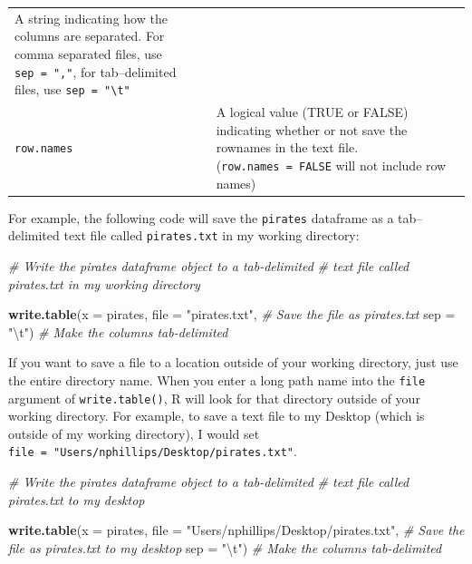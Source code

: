 \documentclass[]{book}
\newenvironment{Shaded}{\begin{snugshade}}{\end{snugshade}}
\newcommand{\KeywordTok}[1]{\textcolor[rgb]{0.13,0.29,0.53}{\textbf{{#1}}}}
\newcommand{\DataTypeTok}[1]{\textcolor[rgb]{0.13,0.29,0.53}{{#1}}}
\newcommand{\CharTok}[1]{\textcolor[rgb]{0.31,0.60,0.02}{{#1}}}
\newcommand{\StringTok}[1]{\textcolor[rgb]{0.31,0.60,0.02}{{#1}}}
\newcommand{\CommentTok}[1]{\textcolor[rgb]{0.56,0.35,0.01}{\textit{{#1}}}}
\newcommand{\NormalTok}[1]{{#1}}
\theoremstyle{definition}
\theoremstyle{definition}
\theoremstyle{remark}
\begin{document}
\begin{longtable}[]{@{}ll@{}}
\begin{minipage}[t]{0.67\columnwidth}
A string indicating how the columns are separated. For comma separated
files, use \texttt{sep\ =\ ","}, for tab--delimited files, use
\texttt{sep\ =\ "\textbackslash{}t"}\strut
\end{minipage}\tabularnewline
\begin{minipage}[t]{0.18\columnwidth}\raggedright\strut
\texttt{row.names}\strut
\end{minipage} & \begin{minipage}[t]{0.67\columnwidth}\raggedright\strut
A logical value (TRUE or FALSE) indicating whether or not save the
rownames in the text file. (\texttt{row.names\ =\ FALSE} will not
include row names)\strut
\end{minipage}\tabularnewline
\bottomrule
\end{longtable}

For example, the following code will save the \texttt{pirates} dataframe
as a tab--delimited text file called \texttt{pirates.txt} in my working
directory:

\begin{Shaded}
\begin{Highlighting}[]
\CommentTok{# Write the pirates dataframe object to a tab-delimited}
\CommentTok{#  text file called pirates.txt in my working directory}

\KeywordTok{write.table}\NormalTok{(}\DataTypeTok{x =} \NormalTok{pirates,}
            \DataTypeTok{file =} \StringTok{"pirates.txt"}\NormalTok{,  }\CommentTok{# Save the file as pirates.txt}
            \DataTypeTok{sep =} \StringTok{"}\CharTok{\textbackslash{}t}\StringTok{"}\NormalTok{)            }\CommentTok{# Make the columns tab-delimited}
\end{Highlighting}
\end{Shaded}

If you want to save a file to a location outside of your working
directory, just use the entire directory name. When you enter a long
path name into the \texttt{file} argument of \texttt{write.table()}, R
will look for that directory outside of your working directory. For
example, to save a text file to my Desktop (which is outside of my
working directory), I would set
\texttt{file\ =\ "Users/nphillips/Desktop/pirates.txt"}.

\begin{Shaded}
\begin{Highlighting}[]
\CommentTok{# Write the pirates dataframe object to a tab-delimited}
\CommentTok{#  text file called pirates.txt to my desktop}

\KeywordTok{write.table}\NormalTok{(}\DataTypeTok{x =} \NormalTok{pirates,}
            \DataTypeTok{file =} \StringTok{"Users/nphillips/Desktop/pirates.txt"}\NormalTok{,  }\CommentTok{# Save the file as pirates.txt to my desktop}
            \DataTypeTok{sep =} \StringTok{"}\CharTok{\textbackslash{}t}\StringTok{"}\NormalTok{)                                    }\CommentTok{# Make the columns tab-delimited}
\end{Highlighting}
\end{Shaded}
\end{document}
